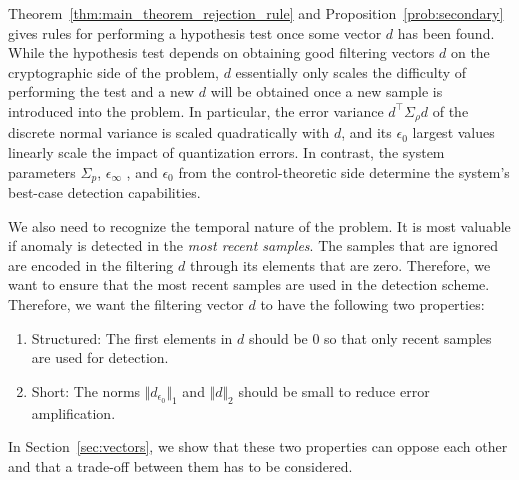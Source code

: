 \documentclass[journal, twoside, web]{ieeecolorpreprint}
\begin{document}
Theorem~\ref{thm:main_theorem_rejection_rule} and Proposition~\ref{prob:secondary} gives rules for performing a hypothesis test once some vector $d$ has been found. %
While the hypothesis test depends on obtaining good filtering vectors $d$ on the cryptographic side of the problem, $d$ essentially only scales the difficulty of performing the test and a new $d$ will be obtained once a new sample is introduced into the problem. In particular, the error variance $d^\top \Sigma_\rho d$ of the discrete normal variance is scaled quadratically with $d$, and its $\epsilon_0$ largest values linearly scale the impact of quantization errors. In contrast, the system parameters $\Sigma_p$, $\epsilon_\infty$ , and $\epsilon_0$ from the control-theoretic side determine the system's best-case detection capabilities.

We also need to recognize the temporal nature of the problem. It is most valuable if anomaly is detected in the \emph{most recent samples}. The samples that are ignored are encoded in the filtering $d$ through its elements that are zero. Therefore, we want to ensure that the most recent samples are used in the detection scheme. Therefore, we want the filtering vector $d$ to have the following two properties:
\begin{enumerate}
    \item Structured: The first elements in $d$ should be 0 so that only recent samples are used for detection.
    \item Short: The norms $\Vert d_{\epsilon_0} \Vert_1$ and $\Vert d\Vert_2$ should be small to reduce error amplification.
\end{enumerate}
In Section~\ref{sec:vectors}, we show that these two properties can oppose each other and that a trade-off between them has to be considered.
\end{document}
